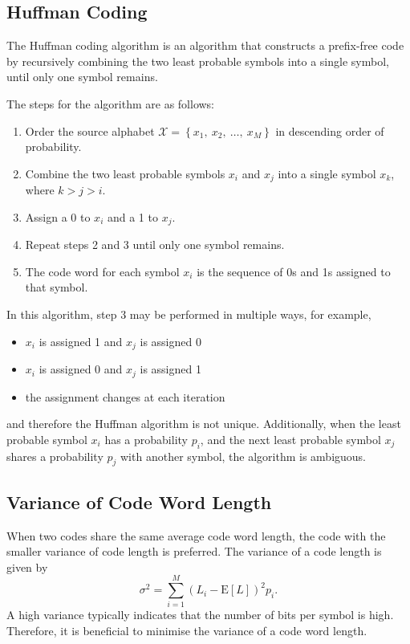 \documentclass{article}
\begin{document}
\subsection{Huffman Coding}
The Huffman coding algorithm is an algorithm that constructs a
prefix-free code by recursively combining the two least probable
symbols into a single symbol, until only one symbol remains.

The steps for the algorithm are as follows:
\begin{enumerate}
    \item Order the source alphabet \(\mathcal{X} = \left\{ x_1,\:
          x_2,\: \dots,\: x_M \right\}\) in descending order of
          probability.
    \item Combine the two least probable symbols \(x_i\) and \(x_j\)
          into a single symbol \(x_k\), where \(k > j > i\).
    \item Assign a 0 to \(x_i\) and a 1 to \(x_j\).
    \item Repeat steps 2 and 3 until only one symbol remains.
    \item The code word for each symbol \(x_i\) is the sequence of 0s
          and 1s assigned to that symbol.
\end{enumerate}
In this algorithm, step 3 may be performed in multiple ways, for example,
\begin{itemize}
    \item \(x_i\) is assigned 1 and \(x_j\) is assigned 0
    \item \(x_i\) is assigned 0 and \(x_j\) is assigned 1
    \item the assignment changes at each iteration
\end{itemize}
and therefore the Huffman algorithm is not unique. Additionally, when
the least probable symbol \(x_i\) has a probability \(p_i\), and the next
least probable symbol \(x_j\) shares a probability \(p_j\) with another
symbol, the algorithm is ambiguous.
\subsection{Variance of Code Word Length}
When two codes share the same average code word length, the code with
the smaller variance of code length is preferred. The variance of a
code length is given by
\begin{equation*}
    \sigma^2 = \sum_{i=1}^{M} \left( L_i - \mathrm{E}\left[ L \right] \right)^2 p_i.
\end{equation*}
A high variance typically indicates that the number of bits per symbol
is high. Therefore, it is beneficial to minimise the variance of a code
word length.
\end{document}
